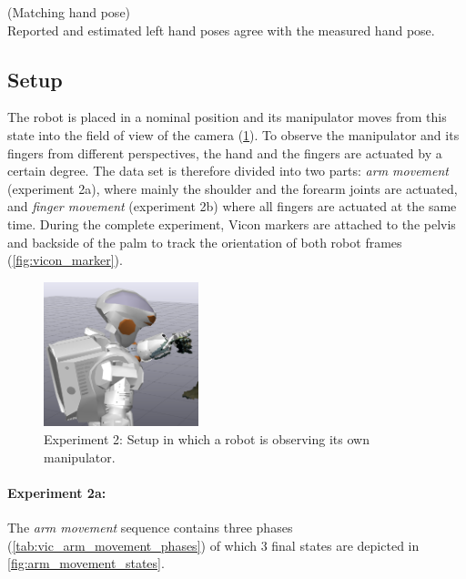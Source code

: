 \begin{hypothesis}(Matching hand pose)\\
Reported and estimated left hand poses agree with the measured hand pose.
\label{hyp:matching_hand_pose}
\end{hypothesis}


\subsection{Setup}

The robot is placed in a nominal position and its manipulator moves from this state into the field of view of the camera (\cref{fig:vicon_free_movement}). To observe the manipulator and its fingers from different perspectives, the hand and the fingers are actuated by a certain degree. The data set is therefore divided into two parts: \textit{arm movement} (experiment 2a), where mainly the shoulder and the forearm joints are actuated, and \textit{finger movement} (experiment 2b) where all fingers are actuated at the same time. During the complete experiment, Vicon markers are attached to the pelvis and backside of the palm to track the orientation of both robot frames (\cref{fig:vicon_marker}).

\begin{figure}[h]
\captionsetup{width=0.4\textwidth}
\centering
\includegraphics[width=0.4\textwidth]{images/eval_vicon/sequence/setting.png}
\caption{Experiment 2: Setup in which a robot is observing its own manipulator.}
\label{fig:vicon_free_movement}
\end{figure}

\paragraph{Experiment 2a:}
The \textit{arm movement} sequence contains three phases (\cref{tab:vic_arm_movement_phases}) of which 3 final states are depicted in \cref{fig:arm_movement_states}.

